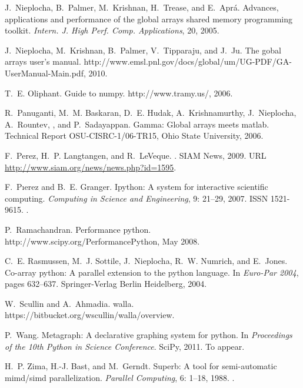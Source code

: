 \documentclass{sigplanconf}
\begin{document}
\begin{thebibliography}{36}
J.~Nieplocha, B.~Palmer, M.~Krishnan, H.~Trease, and E.~Apr\'{a}.
\newblock Advances, applications and performance of the global arrays shared
  memory programming toolkit.
\newblock \emph{Intern. J. High Perf. Comp. Applications}, 20,
  2005{}.

J.~Nieplocha, M.~Krishnan, B.~Palmer, V.~Tipparaju, and J.~Ju.
\newblock The gobal arrays user's manual.
\newblock http://www.emsl.pnl.gov/docs/global/um/UG-PDF/GA-UserManual-Main.pdf,
  2010.

T.~E. Oliphant.
\newblock Guide to numpy.
\newblock http://www.tramy.us/, 2006.

R.~Panuganti, M.~M. Baskaran, D.~E. Hudak, A.~Krishnamurthy, J.~Nieplocha,
  A.~Rountev, , and P.~Sadayappan.
\newblock Gamma: Global arrays meets matlab.
\newblock Technical Report OSU-CISRC-1/06-TR15, Ohio State University, 2006.

F.~Perez, H.~P. Langtangen, and R.~LeVeque.
.
\newblock SIAM News, 2009.
\newblock URL \url{http://www.siam.org/news/news.php?id=1595}.

F.~P\i{e}rez and B.~E. Granger.
\newblock Ipython: A system for interactive scientific computing.
\newblock \emph{Computing in Science and Engineering}, 9: 21--29,
  2007.
\newblock ISSN 1521-9615.
\newblock {}.

P.~Ramachandran.
\newblock Performance python.
\newblock http://www.scipy.org/PerformancePython, May 2008.

C.~E. Rasmussen, M.~J. Sottile, J.~Nieplocha, R.~W. Numrich, and E.~Jones.
\newblock Co-array python: A parallel extension to the python language.
\newblock In \emph{Euro-Par 2004}, pages 632--637. Springer-Verlag Berlin
  Heidelberg, 2004.

W.~Scullin and A.~Ahmadia.
\newblock walla.
\newblock https://bitbucket.org/wscullin/walla/overview.

P.~Wang.
\newblock Metagraph: A declarative graphing system for python.
\newblock In \emph{Proceedings of the 10th Python in Science Conference}.
  SciPy, 2011.
\newblock To appear.

H.~P. Zima, H.-J. Bast, and M.~Gerndt.
\newblock Superb: A tool for semi-automatic mimd/simd parallelization.
\newblock \emph{Parallel Computing}, 6: 1--18, 1988.
\newblock {}.

\end{thebibliography}
\end{document}
